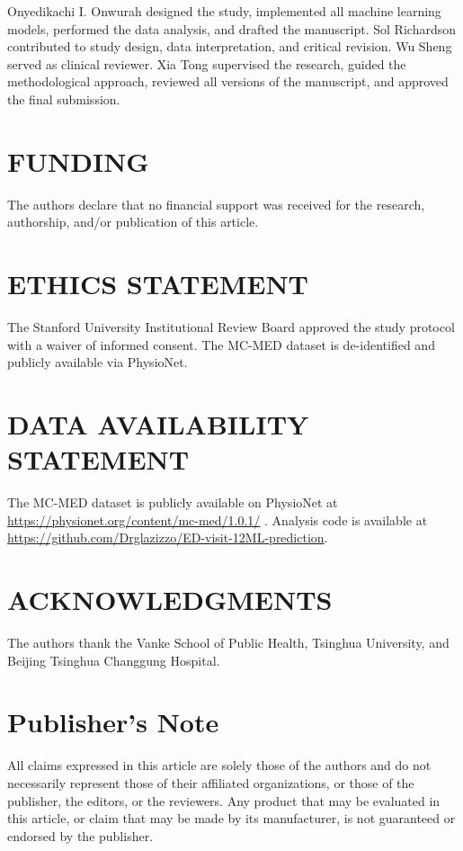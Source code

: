 \documentclass[harvard,article]{frontiersinFPHY_FAMS}
\begin{document}
Onyedikachi I. Onwurah designed the study, implemented all machine learning models, performed the data analysis, and drafted the manuscript. Sol Richardson contributed to study design, data interpretation, and critical revision. Wu Sheng served as clinical reviewer. Xia Tong supervised the research, guided the methodological approach, reviewed all versions of the manuscript, and approved the final submission.
\section{FUNDING}

The authors declare that no financial support was received for the research, authorship, and/or publication of this article.

\section{ETHICS STATEMENT}

The Stanford University Institutional Review Board approved the study protocol with a waiver of informed consent. The MC-MED dataset is de-identified and publicly available via PhysioNet.

\section{DATA AVAILABILITY STATEMENT}

The MC-MED dataset is publicly available on PhysioNet at \url{https://physionet.org/content/mc-med/1.0.1/} \cite{kansal2025}. Analysis code is available at \url{https://github.com/Drglazizzo/ED-visit-12ML-prediction}.

\section{ACKNOWLEDGMENTS}

The authors thank the Vanke School of Public Health, Tsinghua University, and Beijing Tsinghua Changgung Hospital.

\section{Publisher's Note}

All claims expressed in this article are solely those of the authors and do not necessarily represent those of their affiliated organizations, or those of the publisher, the editors, or the reviewers. Any product that may be evaluated in this article, or claim that may be made by its manufacturer, is not guaranteed or endorsed by the publisher.
\end{document}
